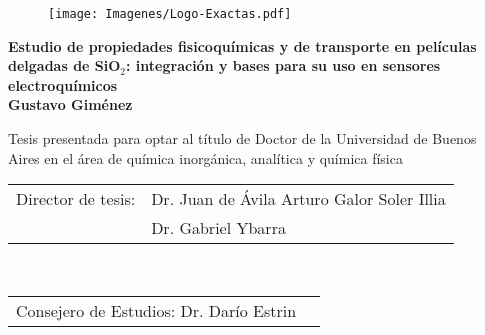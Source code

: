 \begin{titlepage}


		\begin{center}
		\end{center}

		\begin{figure}[ht!]
		\centering
		\texttt{[image: Imagenes/Logo-Exactas.pdf]}%
	 	\end{figure}

	 	\begin{center}
	 	\large{\bfseries{Estudio de propiedades fisicoquímicas y de transporte en películas delgadas de SiO$_2$: integración y bases para su uso en sensores electroquímicos}} \\ \vspace*{1.2cm}
	 	\Large{\bfseries{Gustavo Giménez}} \\ \vspace*{1.2cm}
	 	
	 	\normalsize{Tesis presentada para optar al título de Doctor de la Universidad de Buenos Aires en el área de química inorgánica, analítica y química física} \\ 
	 	\end{center}
		
		\vspace*{1cm}

		\setlength\tabcolsep{1.5pt}
		\noindent\begin{tabular}{@{}ll}
		Director de tesis: & Dr. Juan de Ávila Arturo Galor Soler Illia \\  %
						   & Dr. Gabriel Ybarra \\						%
		\end{tabular} \\
		\noindent\begin{tabular}{@{}ll}
		Consejero de Estudios: Dr. Darío Estrin \\ %
		\end{tabular} \\ 


\end{titlepage}
